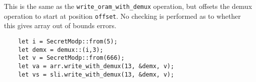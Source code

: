 This is the same as the \verb|write_oram_with_demux| operation, 
but offsets the demux operation to start at position \verb|offset|.
No checking is performed as to whether this gives array out
of bounds errors.
\begin{lstlisting}
    let i = SecretModp::from(5);
    let demx = demux::(i,3);
    let v = SecretModp::from(666);
    let va = arr.write_with_demux(13, &demx, v);
    let vs = sli.write_with_demux(13, &demx, v);
\end{lstlisting}



